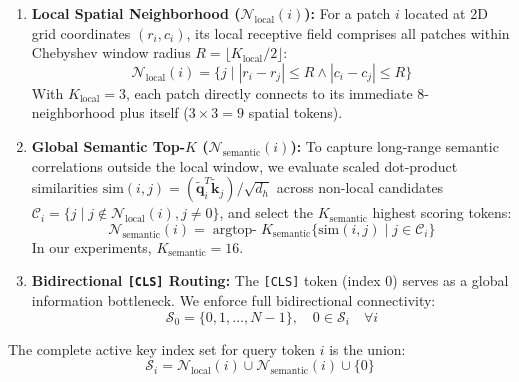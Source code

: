 \documentclass[11pt,a4paper]{article}
\begin{document}
\begin{enumerate}[leftmargin=*]
    \item \textbf{Local Spatial Neighborhood ($\mathcal{N}_{\text{local}}(i)$):} For a patch $i$ located at 2D grid coordinates $(r_i, c_i)$, its local receptive field comprises all patches within Chebyshev window radius $R = \lfloor K_{\text{local}} / 2 \rfloor$:
    \begin{equation}
    \mathcal{N}_{\text{local}}(i) = \{j \mid |r_i - r_j| \le R \land |c_i - c_j| \le R\}
    \label{eq:local_window}
    \end{equation}
    With $K_{\text{local}} = 3$, each patch directly connects to its immediate 8-neighborhood plus itself ($3 \times 3 = 9$ spatial tokens).
    \item \textbf{Global Semantic Top-$K$ ($\mathcal{N}_{\text{semantic}}(i)$):} To capture long-range semantic correlations outside the local window, we evaluate scaled dot-product similarities $\text{sim}(i, j) = (\tilde{\mathbf{q}}_i^T \tilde{\mathbf{k}}_j) / \sqrt{d_h}$ across non-local candidates $\mathcal{C}_i = \{j \mid j \notin \mathcal{N}_{\text{local}}(i), j \neq 0\}$, and select the $K_{\text{semantic}}$ highest scoring tokens:
    \begin{equation}
    \mathcal{N}_{\text{semantic}}(i) = \operatorname{argtop-}K_{\text{semantic}} \{\text{sim}(i, j) \mid j \in \mathcal{C}_i\}
    \label{eq:semantic_topk}
    \end{equation}
    In our experiments, $K_{\text{semantic}} = 16$.
    \item \textbf{Bidirectional \texttt{[CLS]} Routing:} The \texttt{[CLS]} token (index 0) serves as a global information bottleneck. We enforce full bidirectional connectivity:
    \begin{equation}
    \mathcal{S}_0 = \{0, 1, \dots, N-1\}, \quad 0 \in \mathcal{S}_i \quad \forall i
    \label{eq:cls_routing}
    \end{equation}
\end{enumerate}

The complete active key index set for query token $i$ is the union:
\begin{equation}
\mathcal{S}_i = \mathcal{N}_{\text{local}}(i) \cup \mathcal{N}_{\text{semantic}}(i) \cup \{0\}
\label{eq:complete_support}
\end{equation}
\end{document}
